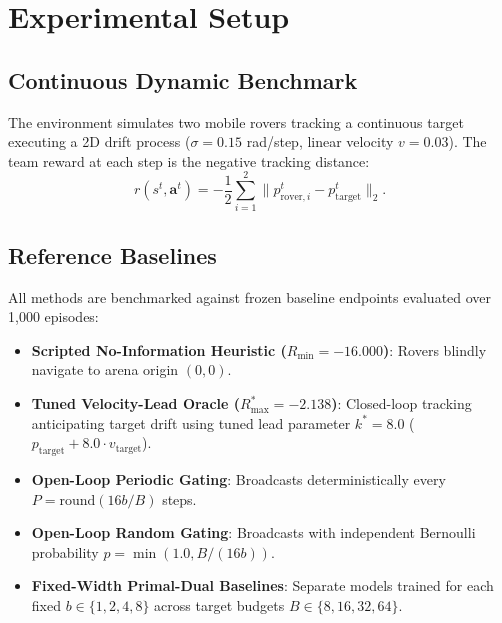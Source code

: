 \documentclass[10pt,twocolumn,letterpaper]{article}
\begin{document}
\section{Experimental Setup}

\subsection{Continuous Dynamic Benchmark}
The environment simulates two mobile rovers tracking a continuous target executing a 2D drift process ($\sigma = 0.15$ rad/step, linear velocity $v = 0.03$). The team reward at each step is the negative tracking distance:
\begin{equation}
    r(s^t, \mathbf{a}^t) = - \frac{1}{2} \sum_{i=1}^2 \| p_{\mathrm{rover}, i}^t - p_{\mathrm{target}}^t \|_2.
\end{equation}

\subsection{Reference Baselines}
All methods are benchmarked against frozen baseline endpoints evaluated over 1,000 episodes:
\begin{itemize}
    \item \textbf{Scripted No-Information Heuristic ($R_{\min} = -16.000$)}: Rovers blindly navigate to arena origin $(0, 0)$.
    \item \textbf{Tuned Velocity-Lead Oracle ($R_{\max}^* = -2.138$)}: Closed-loop tracking anticipating target drift using tuned lead parameter $k^* = 8.0$ ($p_{\mathrm{target}} + 8.0 \cdot v_{\mathrm{target}}$).
    \item \textbf{Open-Loop Periodic Gating}: Broadcasts deterministically every $P = \mathrm{round}(16 b / B)$ steps.
    \item \textbf{Open-Loop Random Gating}: Broadcasts with independent Bernoulli probability $p = \min(1.0, B / (16 b))$.
    \item \textbf{Fixed-Width Primal-Dual Baselines}: Separate models trained for each fixed $b \in \{1, 2, 4, 8\}$ across target budgets $B \in \{8, 16, 32, 64\}$.
\end{itemize}
\end{document}
